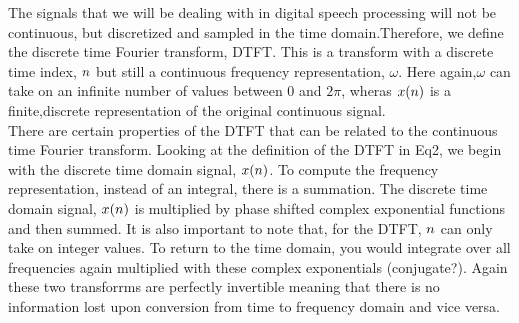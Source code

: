   
   
  
 The signals that we will be dealing with in digital speech processing will not be continuous, but discretized and sampled in the time domain.Therefore, we define the discrete time Fourier transform, DTFT. This is a transform with a discrete time index, \begin{math}n\end{math} but still a continuous frequency representation, \begin{math}\omega\end{math}. Here again,\begin{math}\omega\end{math} can take on an infinite number of values between 0 and \begin{math}2\pi\end{math}, wheras \begin{math}x(n)\end{math} is a finite,discrete representation of the original continuous signal. \\
  
    There are certain properties of the DTFT that can be related to the continuous time Fourier transform.  Looking at the definition of the DTFT in Eq2, we begin with the discrete time domain signal, \begin{math}x(n)\end{math}. To compute the frequency representation, instead of an integral, there is a summation.  The discrete time domain signal, \begin{math}x(n)\end{math} is  multiplied by phase shifted complex exponential functions and then summed. It is also important to note that, for the DTFT,  \begin{math}n\end{math} can only take on integer values. To return to the time domain, you would integrate over all frequencies again multiplied with these complex exponentials (conjugate?). Again these two transforrms are perfectly invertible meaning that there is no information lost upon conversion from time to frequency domain and vice versa.\\
    
